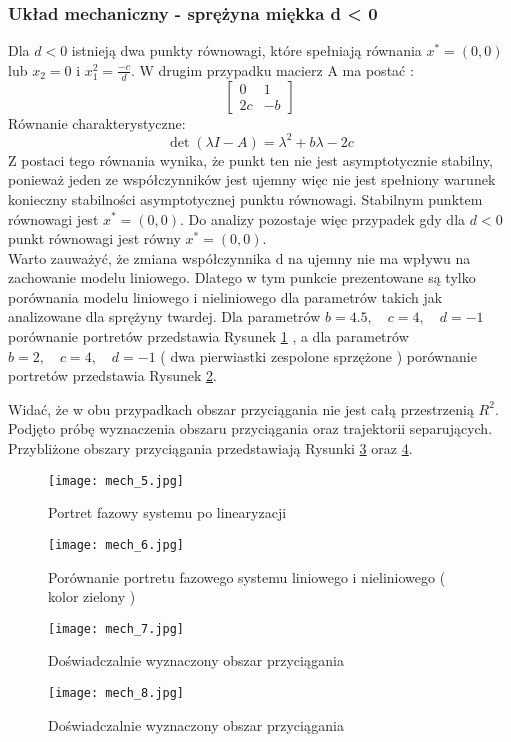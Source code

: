 \documentclass[a4paper,11pt]{article}
\begin{document}
\subsubsection{Układ mechaniczny - sprężyna miękka d < 0}
Dla \(d<0\) istnieją dwa punkty równowagi, które spełniają równania \(x^{*}=(0,0)\) lub \(x_{2}=0\) i \(x_{1}^{2}=\frac{-c}{d}\). W drugim przypadku macierz A ma postać : 
\begin{equation*}
\begin{bmatrix}
0 & 1 \\
2c & -b 
\end{bmatrix}
\end{equation*}
Równanie charakterystyczne: 
\begin{equation*}
\det{(\lambda I-A)}=\lambda^{2}+b\lambda-2c
\end{equation*}
Z postaci tego równania wynika, że punkt ten nie jest asymptotycznie stabilny, ponieważ jeden ze współczynników jest ujemny więc nie jest spełniony warunek konieczny stabilności asymptotycznej punktu równowagi. 
Stabilnym punktem równowagi jest \(x^{*}=(0,0)\). Do analizy pozostaje więc przypadek gdy dla \(d<0\) punkt równowagi jest równy \(x^{*}=(0,0)\). \\

Warto zauważyć, że zmiana współczynnika d na ujemny nie ma wpływu na zachowanie modelu liniowego. Dlatego w tym punkcie prezentowane są tylko porównania modelu liniowego i nieliniowego dla parametrów takich jak analizowane dla sprężyny twardej. Dla parametrów \(b=4.5,\quad c=4,\quad d=-1\) porównanie portretów przedstawia Rysunek  \ref{fig:mech_5} , a dla parametrów \(b=2,\quad c=4,\quad d=-1\) ( dwa pierwiastki zespolone sprzężone ) porównanie portretów przedstawia Rysunek \ref{fig:mech_6}.

Widać, że w obu przypadkach obszar przyciągania nie jest całą przestrzenią \(R^{2}\). Podjęto próbę wyznaczenia obszaru przyciągania oraz trajektorii separujących. Przybliżone obszary przyciągania przedstawiają Rysunki \ref{fig:mech_7} oraz \ref{fig:mech_8}.
\begin{figure}[h!]
\centerline{\texttt{[image: mech\_5.jpg]}}
\centering
\caption{Portret fazowy systemu po linearyzacji}
\label{fig:mech_5}
\end{figure}
\begin{figure}[H]
\centerline{\texttt{[image: mech\_6.jpg]}}
\caption{Porównanie portretu fazowego systemu liniowego i nieliniowego ( kolor zielony )}
\label{fig:mech_6}
\end{figure}
\begin{figure}[H]
\centerline{\texttt{[image: mech\_7.jpg]}}
\centering
\caption{Doświadczalnie wyznaczony obszar przyciągania}
\label{fig:mech_7}
\end{figure}
\begin{figure}[H]
\centerline{\texttt{[image: mech\_8.jpg]}}
\caption{Doświadczalnie wyznaczony obszar przyciągania}
\label{fig:mech_8}
\end{figure}
\end{document}

